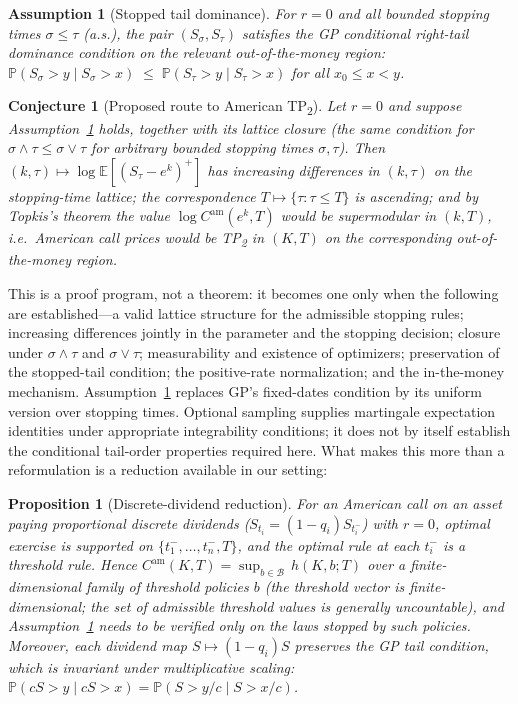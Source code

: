 \documentclass[11pt]{article}
\newtheorem{proposition}{Proposition}
\newtheorem{assumption}{Assumption}
\newtheorem{conjecture}{Conjecture}
\theoremstyle{remark}
\newcommand{\Cam}{C^{\mathrm{am}}}
\newcommand{\E}{\mathbb{E}}
\newcommand{\Prob}{\mathbb{P}}
\begin{document}
\begin{assumption}[Stopped tail dominance]\label{ass:stopped}
For $r=0$ and all bounded stopping times $\sigma\le\tau$ (a.s.), the pair $(S_\sigma,S_\tau)$ satisfies the GP conditional right-tail dominance condition on the relevant out-of-the-money region:
$\Prob(S_\sigma>y\mid S_\sigma>x)\;\le\;\Prob(S_\tau>y\mid S_\tau>x)$ for all $x_0\le x<y$.
\end{assumption}

\begin{conjecture}[Proposed route to American TP\textsubscript{2}]\label{thm:topkis}
Let $r=0$ and suppose Assumption~\ref{ass:stopped} holds, together with its lattice closure (the same condition for $\sigma\wedge\tau\le\sigma\vee\tau$ for arbitrary bounded stopping times $\sigma,\tau$). Then $(k,\tau)\mapsto\log\E[(S_\tau-e^{k})^+]$ has increasing differences in $(k,\tau)$ on the stopping-time lattice; the correspondence $T\mapsto\{\tau:\tau\le T\}$ is ascending; and by Topkis's theorem the value $\log\Cam(e^k,T)$ would be supermodular in $(k,T)$, i.e.\ American call prices would be TP\textsubscript{2} in $(K,T)$ on the corresponding out-of-the-money region.
\end{conjecture}

This is a proof program, not a theorem: it becomes one only when the following are established---a valid lattice structure for the admissible stopping rules; increasing differences jointly in the parameter and the stopping decision; closure under $\sigma\wedge\tau$ and $\sigma\vee\tau$; measurability and existence of optimizers; preservation of the stopped-tail condition; the positive-rate normalization; and the in-the-money mechanism. Assumption~\ref{ass:stopped} replaces GP's fixed-dates condition by its uniform version over stopping times. Optional sampling supplies martingale expectation identities under appropriate integrability conditions; it does not by itself establish the conditional tail-order properties required here. What makes this more than a reformulation is a reduction available in our setting:

\begin{proposition}[Discrete-dividend reduction]\label{prop:reduction}
For an American call on an asset paying proportional discrete dividends ($S_{t_i}=(1-q_i)S_{t_i^-}$) with $r=0$, optimal exercise is supported on $\{t_1^-,\ldots,t_n^-,T\}$, and the optimal rule at each $t_i^-$ is a threshold rule. Hence $\Cam(K,T)=\sup_{b\in\mathcal B}\,h(K,b;T)$ over a finite-dimensional family of threshold policies $b$ (the threshold vector is finite-dimensional; the set of admissible threshold values is generally uncountable), and Assumption~\ref{ass:stopped} needs to be verified only on the laws stopped by such policies. Moreover, each dividend map $S\mapsto(1-q_i)S$ \emph{preserves} the GP tail condition, which is invariant under multiplicative scaling: $\Prob(cS>y\mid cS>x)=\Prob(S>y/c\mid S>x/c)$.
\end{proposition}
\end{document}

